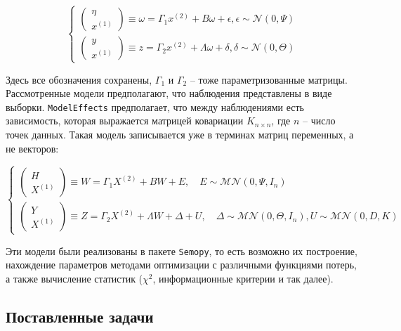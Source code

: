 \begin{equation}\label{eq:modelMeans}
	\begin{cases}
		\begin{pmatrix}
			\eta \\ x^{(1)}
		\end{pmatrix} \equiv \omega = \Gamma_1 x^{(2)} + B \omega + \epsilon, \epsilon \sim \mathcal{N}(0, \Psi) \\
		\begin{pmatrix}
			y \\ x^{(1)}
		\end{pmatrix} \equiv z = \Gamma_2 x^{(2)} + \Lambda \omega + \delta, \delta \sim \mathcal{N}(0, \Theta)
	\end{cases}
\end{equation}

Здесь все обозначения сохранены, $ \Gamma_1 $ и $ \Gamma_2 $ -- тоже параметризованные матрицы. \\

Рассмотренные модели предполагают, что наблюдения представлены в виде выборки. \texttt{ModelEffects} предполагает, что между наблюдениями есть зависимость, которая выражается матрицей ковариации $ K_{ n \times n } $, где $ n $ -- число точек данных.
Такая модель записывается уже в терминах матриц переменных, а не векторов:

\begin{equation}\label{eq:modelEffects}
	\begin{cases}
		\begin{pmatrix}
			H \\ X^{(1)}
		\end{pmatrix} \equiv W = \Gamma_1 X^{(2)} + BW + E, \quad E \sim \mathcal{MN}(0, \Psi, I_n) \\
		\begin{pmatrix}
			Y \\ X^{(1)}
		\end{pmatrix} \equiv Z = \Gamma_2 X^{(2)} + \Lambda W + \Delta + U, \quad \Delta \sim \mathcal{MN}(0, \Theta, I_n), U \sim \mathcal{MN}(0, D, K)
		
	\end{cases}
\end{equation}

Эти модели были реализованы в пакете \texttt{Semopy}, то есть возможно их построение, нахождение параметров методами оптимизации с различными функциями потерь, а также вычисление статистик ($ \chi^2 $, информационные критерии и так далее).

\subsection{Поставленные задачи}

